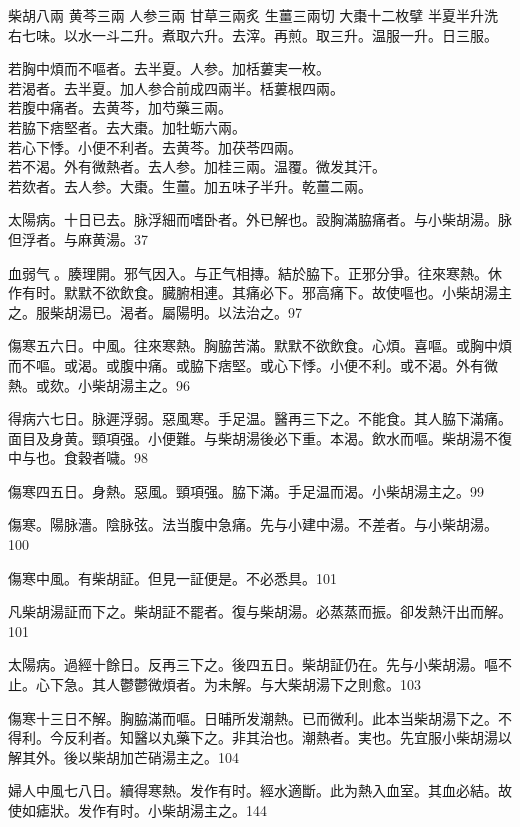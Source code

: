 柴胡{\scriptsize 八兩} 黄芩{\scriptsize 三兩} 人参{\scriptsize 三兩} 甘草{\scriptsize 三兩炙} 生薑{\scriptsize 三兩切} 大棗{\scriptsize 十二枚擘} 半夏{\scriptsize 半升洗}\\
右七味。以水一斗二升。煮取六升。去滓。再煎。取三升。温服一升。日三服。

若胸中煩而不嘔者。去半夏。人参。加栝蔞実一枚。\\
若渴者。去半夏。加人参合前成四兩半。栝蔞根四兩。\\
若腹中痛者。去黄芩，加芍藥三兩。\\
若脇下痞堅者。去大棗。加牡蛎六兩。\\
若心下悸。小便不利者。去黄芩。加茯苓四兩。\\
若不渴。外有微熱者。去人参。加桂三兩。温覆。微发其汗。\\
若欬者。去人参。大棗。生薑。加五味子半升。乾薑二兩。

太陽病。十日已去。脉浮細而嗜卧者。外已解也。設胸滿脇痛者。与小柴胡湯。脉{\khaaitp 但}浮者。与麻黄湯。37

血弱气{\sungtpii 𥁞}。腠理開。邪气因入。与正气相摶。結於脇下。正邪分爭。往來寒熱。休作有时。默默不欲飲食。臓腑相連。其痛必下。邪高痛下。故使嘔也。小柴胡湯主之。服柴胡湯已。渴者。屬陽明。以法治之。97

傷寒五六日。中風。往來寒熱。胸脇苦滿。默默不欲飲食。心煩。喜嘔。或胸中煩而不嘔。或渴。或腹中痛。或脇下痞堅。或心下悸。小便不利。或不渴。外有微熱。或欬。小柴胡湯主之。96

得病六七日。脉遲浮弱。惡風寒。手足温。醫再三下之。不能食。其人脇下滿{\khaaitp 痛}。面目及身黄。頸項强。小便難。与柴胡湯後必下重。本渴。飲水而嘔。柴胡{\khaaitp 湯}不復中与也。食穀者噦。98

傷寒四五日。身熱。惡風。頸項强。脇下滿。手足温而渴。小柴胡湯主之。99

傷寒。陽脉濇。陰脉弦。法当腹中急痛。先与小建中湯。不差者。与小柴胡湯。100

傷寒中風。有柴胡証。但見一証便是。不必悉具。101

凡柴胡湯証而下之。柴胡証不罷者。復与柴胡湯。必蒸蒸而振。卻发熱汗出而解。101

太陽病。過經十餘日。反再三下之。後四五日。柴胡証仍在。先与小柴胡湯。嘔不止。心下急。其人鬱鬱微煩者。为未解。与大柴胡湯下之則愈。103

傷寒十三日不解。胸脇滿而嘔。日晡所发潮熱{\khaaitp 。已}而微利。此本当柴胡湯下之。不得利。今反利者。知醫以丸藥下之。非其治也。潮熱者。実也。先宜服小柴胡湯以解其外。後以柴胡加芒硝湯主之。104

婦人中風七八日。續得寒熱。发作有时。經水適斷。此为熱入血室。其血必結。故使如瘧狀。发作有时。小柴胡湯主之。144

